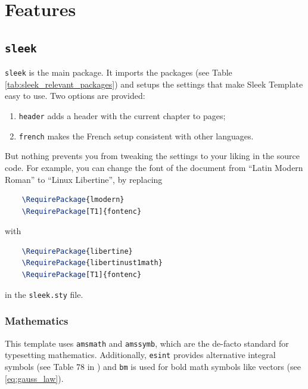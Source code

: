 \documentclass[a4paper, 12pt]{report}
\begin{document}
    \chapter{Features}

    \section{\texttt{sleek}}

    \texttt{sleek} is the main package. It imports the packages (see Table \ref{tab:sleek_relevant_packages}) and setups the settings that make Sleek Template easy to use. Two options are provided:

    \begin{enumerate}[noitemsep]
        \item \texttt{header} adds a header with the current chapter to pages;
        \item \texttt{french} makes the French setup consistent with other languages.
    \end{enumerate}

    But nothing prevents you from tweaking the settings to your liking in the source code. For example, you can change the font of the document from \enquote{Latin Modern Roman} to \enquote{Linux Libertine}, by replacing

    \begin{lstlisting}[style=ruled, language=latex, gobble=4]
    % Font
    \RequirePackage{lmodern}
    \RequirePackage[T1]{fontenc}
    \end{lstlisting}

    with

    \begin{lstlisting}[style=ruled, language=latex, gobble=4]
    % Font
    \RequirePackage{libertine}
    \RequirePackage{libertinust1math}
    \RequirePackage[T1]{fontenc}
    \end{lstlisting}

    in the \texttt{sleek.sty} file.

    \subsection{Mathematics}

    This template uses \texttt{amsmath} and \texttt{amssymb}, which are the de-facto standard for typesetting mathematics. Additionally, \texttt{esint} provides alternative integral symbols (see Table 78 in \cite{pakin2020comprehensive}) and \texttt{bm} is used for bold math symbols like vectors (see \eqref{eq:gauss_law}).
\end{document}
